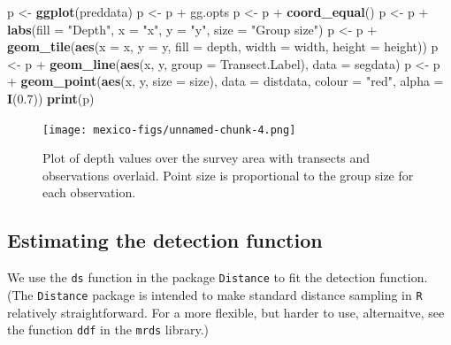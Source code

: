 \documentclass[]{amsart}
\newenvironment{Shaded}{}{}
\newcommand{\KeywordTok}[1]{\textcolor[rgb]{0.00,0.44,0.13}{\textbf{{#1}}}}
\newcommand{\DataTypeTok}[1]{\textcolor[rgb]{0.56,0.13,0.00}{{#1}}}
\newcommand{\FloatTok}[1]{\textcolor[rgb]{0.25,0.63,0.44}{{#1}}}
\newcommand{\StringTok}[1]{\textcolor[rgb]{0.25,0.44,0.63}{{#1}}}
\newcommand{\NormalTok}[1]{{#1}}
\begin{document}
\begin{Shaded}
\begin{Highlighting}[]
\NormalTok{p <-}\StringTok{ }\KeywordTok{ggplot}\NormalTok{(preddata)}
\NormalTok{p <-}\StringTok{ }\NormalTok{p +}\StringTok{ }\NormalTok{gg.opts}
\NormalTok{p <-}\StringTok{ }\NormalTok{p +}\StringTok{ }\KeywordTok{coord_equal}\NormalTok{()}
\NormalTok{p <-}\StringTok{ }\NormalTok{p +}\StringTok{ }\KeywordTok{labs}\NormalTok{(}\DataTypeTok{fill =} \StringTok{"Depth"}\NormalTok{, }\DataTypeTok{x =} \StringTok{"x"}\NormalTok{, }\DataTypeTok{y =} \StringTok{"y"}\NormalTok{, }\DataTypeTok{size =} \StringTok{"Group size"}\NormalTok{)}
\NormalTok{p <-}\StringTok{ }\NormalTok{p +}\StringTok{ }\KeywordTok{geom_tile}\NormalTok{(}\KeywordTok{aes}\NormalTok{(}\DataTypeTok{x =} \NormalTok{x, }\DataTypeTok{y =} \NormalTok{y, }\DataTypeTok{fill =} \NormalTok{depth, }\DataTypeTok{width =} \NormalTok{width, }\DataTypeTok{height =} \NormalTok{height))}
\NormalTok{p <-}\StringTok{ }\NormalTok{p +}\StringTok{ }\KeywordTok{geom_line}\NormalTok{(}\KeywordTok{aes}\NormalTok{(x, y, }\DataTypeTok{group =} \NormalTok{Transect.Label), }\DataTypeTok{data =} \NormalTok{segdata)}
\NormalTok{p <-}\StringTok{ }\NormalTok{p +}\StringTok{ }\KeywordTok{geom_point}\NormalTok{(}\KeywordTok{aes}\NormalTok{(x, y, }\DataTypeTok{size =} \NormalTok{size), }\DataTypeTok{data =} \NormalTok{distdata, }\DataTypeTok{colour =} \StringTok{"red"}\NormalTok{, }
    \DataTypeTok{alpha =} \KeywordTok{I}\NormalTok{(}\FloatTok{0.7}\NormalTok{))}
\KeywordTok{print}\NormalTok{(p)}
\end{Highlighting}
\end{Shaded}

\begin{figure}[htbp]
\centering
\texttt{[image: mexico-figs/unnamed-chunk-4.png]}
\caption{Plot of depth values over the survey area with transects and
observations overlaid. Point size is proportional to the group size for
each observation.}
\end{figure}

\subsection{Estimating the detection function}

We use the \texttt{ds} function in the package \texttt{Distance} to fit
the detection function. (The \texttt{Distance} package is intended to
make standard distance sampling in \texttt{R} relatively
straightforward. For a more flexible, but harder to use, alternaitve,
see the function \texttt{ddf} in the \texttt{mrds} library.)
\end{document}
